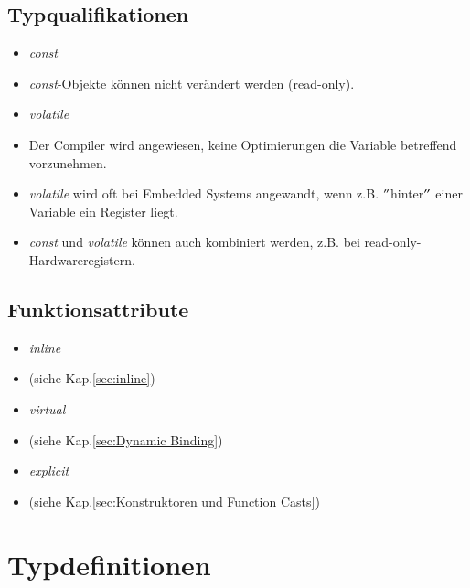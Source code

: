 \subsection{Typqualifikationen}
\begin{itemize}
	\item \emph{const}
	\item[\-] \emph{const}-Objekte können nicht verändert werden (read-only).
	\item \emph{volatile}
	\item[\-]Der Compiler wird angewiesen, keine Optimierungen die Variable betreffend vorzunehmen.
	\item \emph{volatile} wird oft bei Embedded Systems angewandt, wenn z.B. $"$hinter$"$ einer Variable ein Register liegt.
	\item \emph{const} und \emph{volatile} können auch kombiniert werden, z.B. bei read-only-Hardwareregistern.
\end{itemize}

\subsection{Funktionsattribute}
\begin{itemize}
	\item \emph{inline}
	\item[\-] (siehe Kap.\ref{sec:inline})
	\item \emph{virtual}
	\item[\-] (siehe Kap.\ref{sec:Dynamic Binding})
	\item \emph{explicit}
	\item[\-] (siehe Kap.\ref{sec:Konstruktoren und Function Casts})
\end{itemize}

\section{Typdefinitionen}

